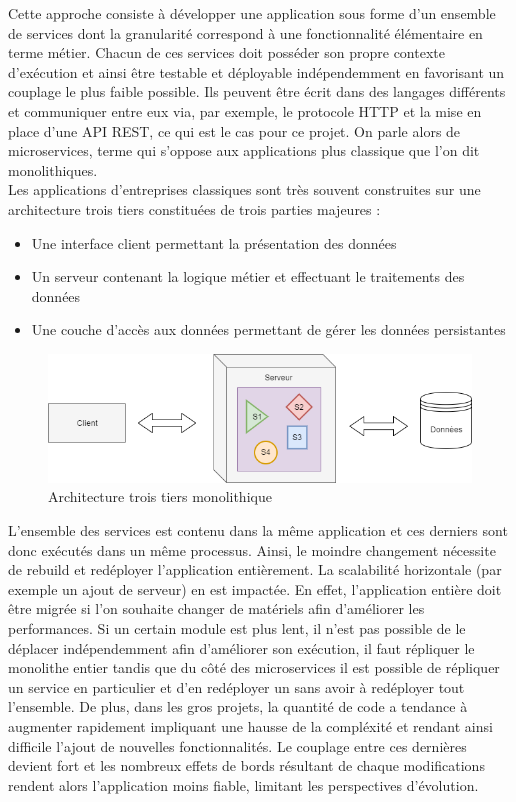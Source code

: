 	Cette approche consiste à développer une application sous forme d'un ensemble de services dont la granularité correspond à une fonctionnalité élémentaire en terme métier. Chacun de ces services doit posséder son propre contexte d'exécution et ainsi être testable et déployable indépendemment en favorisant un couplage le plus faible possible. Ils peuvent être écrit dans des langages différents et communiquer entre eux via, par exemple, le protocole HTTP et la mise en place d'une API REST, ce qui est le cas pour ce projet. On parle alors de microservices, terme qui s'oppose aux applications plus classique que l'on dit monolithiques.\\
	
	Les applications d'entreprises classiques sont très souvent construites sur une architecture trois tiers constituées de trois parties majeures :
	\begin{itemize}
		\item Une interface client permettant la présentation des données
		\item Un serveur contenant la logique métier et effectuant le traitements des données
		\item Une couche d'accès aux données permettant de gérer les données persistantes \\
	\end{itemize}
	
\begin{figure}[h!]
	\includegraphics[scale=0.5]{images/travailNeuflizeOBC/architecture/troisTiers.png}
	\centering
	\caption{Architecture trois tiers monolithique}
	\label{troisTiers}
\end{figure}
	
	L'ensemble des services est contenu dans la même application et ces derniers sont donc exécutés dans un même processus. Ainsi, le moindre changement nécessite de rebuild et redéployer l'application entièrement. La scalabilité horizontale (par exemple un ajout de serveur) en est impactée. En effet, l'application entière doit être migrée si l'on souhaite changer de matériels afin d'améliorer les performances. Si un certain module est plus lent, il n'est pas possible de le déplacer indépendemment afin d'améliorer son exécution, il faut répliquer le monolithe entier tandis que du côté des microservices il est possible de répliquer un service en particulier et d'en redéployer un sans avoir à redéployer tout l'ensemble. De plus, dans les gros projets, la quantité de code a tendance à augmenter rapidement impliquant une hausse de la compléxité et rendant ainsi difficile l'ajout de nouvelles fonctionnalités. Le couplage entre ces dernières devient fort et les nombreux effets de bords résultant de chaque modifications rendent alors l'application moins fiable, limitant les perspectives d'évolution.

